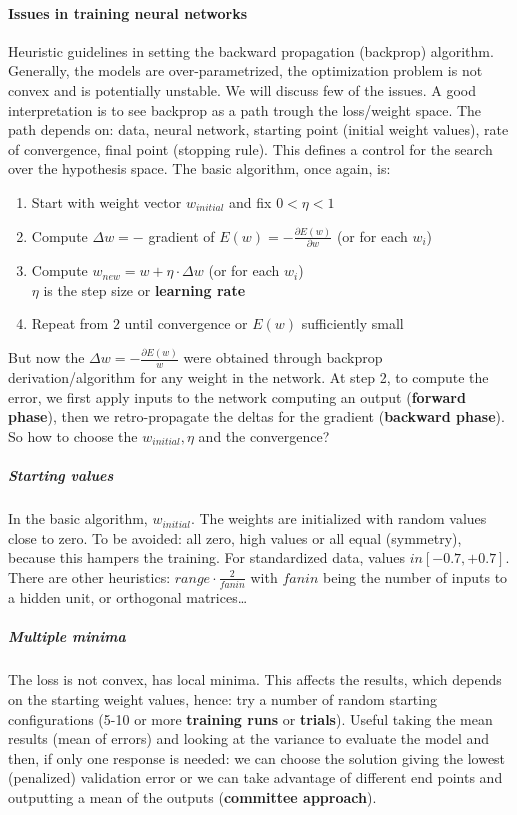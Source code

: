 \documentclass[10pt]{report}
\begin{document}
\paragraph{Issues in training neural networks} Heuristic guidelines in setting the backward propagation (backprop) algorithm. Generally, the models are over-parametrized, the optimization problem is not convex and is potentially unstable. We will discuss few of the issues. A good interpretation is to see backprop as a path trough the loss/weight space. The path depends on: data, neural network, starting point (initial weight values), rate of convergence, final point (stopping rule). This defines a control for the search over the hypothesis space. The basic algorithm, once again, is:
\begin{enumerate}
	\item Start with weight vector $w_{initial}$ and fix $0 < \eta < 1$
	\item Compute $\Delta w = -$ gradient of $E(w) = -\frac{\partial E(w)}{\partial w}$ (or for each $w_i$)
	\item Compute $w_{new} = w + \eta\cdot\Delta w$ (or for each $w_i$)\\
	$\eta$ is the step size or \textbf{learning rate}
	\item Repeat from $2$ until convergence or $E(w)$ sufficiently small
\end{enumerate}
But now the $\Delta w =-\frac{\partial E(w)}{w}$ were obtained through backprop derivation/algorithm for any weight in the network. At step 2, to compute the error, we first apply inputs to the network computing an output (\textbf{forward phase}), then we retro-propagate the deltas for the gradient (\textbf{backward phase}). So how to choose the $w_{initial}, \eta$ and the convergence?
\subparagraph{Starting values} In the basic algorithm, $w_{initial}$. The weights are initialized with random values close to zero. To be avoided: all zero, high values or all equal (symmetry), because this hampers the training. For standardized data, values $in [-0.7, +0.7]$. There are other heuristics: $range \cdot \frac{2}{fanin}$ with $fanin$ being the number of inputs to a hidden unit, or orthogonal matrices\ldots
\subparagraph{Multiple minima} The loss is not convex, has local minima. This affects the results, which depends on the starting weight values, hence: try a number of random starting configurations (5-10 or more \textbf{training runs} or \textbf{trials}). Useful taking the mean results (mean of errors) and looking at the variance to evaluate the model and then, if only one response is needed: we can choose the solution giving the lowest (penalized) validation error or we can take advantage of different end points and outputting a mean of the outputs (\textbf{committee approach}).\\
\end{document}
